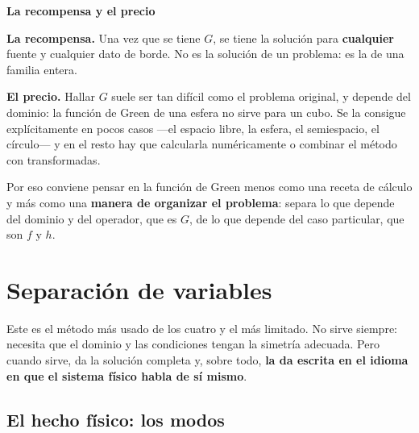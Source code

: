 \documentclass[
  spanish,
  a4paper,
]{scrbook}
\theoremstyle{definition}
\theoremstyle{plain}
\theoremstyle{definition}
\theoremstyle{plain}
\theoremstyle{definition}
\theoremstyle{remark}
\begin{document}
\begin{tcolorbox}[enhanced jigsaw, arc=.35mm, bottomrule=.15mm, breakable, colback=white, colframe=quarto-callout-warning-color-frame, left=2mm, leftrule=.75mm, opacityback=0, rightrule=.15mm, toprule=.15mm]
\begin{minipage}[t]{5.5mm}
\textcolor{quarto-callout-warning-color}{\faExclamationTriangle}
\end{minipage}%
\begin{minipage}[t]{\textwidth - 5.5mm}

\vspace{-3mm}\textbf{La recompensa y el precio}\vspace{3mm}

\textbf{La recompensa.} Una vez que se tiene \(G\), se tiene la solución
para \textbf{cualquier} fuente y cualquier dato de borde. No es la
solución de un problema: es la de una familia entera.

\textbf{El precio.} Hallar \(G\) suele ser tan difícil como el problema
original, y depende del dominio: la función de Green de una esfera no
sirve para un cubo. Se la consigue explícitamente en pocos casos ---el
espacio libre, la esfera, el semiespacio, el círculo--- y en el resto
hay que calcularla numéricamente o combinar el método con transformadas.

Por eso conviene pensar en la función de Green menos como una receta de
cálculo y más como una \textbf{manera de organizar el problema}: separa
lo que depende del dominio y del operador, que es \(G\), de lo que
depende del caso particular, que son \(f\) y \(h\).

\end{minipage}%
\end{tcolorbox}

\section{Separación de variables}\label{sec-separacion}

Este es el método más usado de los cuatro y el más limitado. No sirve
siempre: necesita que el dominio y las condiciones tengan la simetría
adecuada. Pero cuando sirve, da la solución completa y, sobre todo,
\textbf{la da escrita en el idioma en que el sistema físico habla de sí
mismo}.

\subsection{El hecho físico: los modos}\label{sec-modos}
\end{document}
